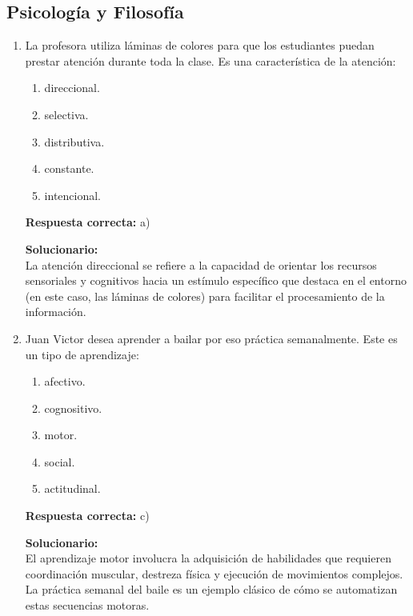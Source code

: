 \subsection*{Psicología y Filosofía}

\begin{enumerate}
	
	
	\item La profesora utiliza láminas de colores para que los estudiantes puedan prestar atención durante toda la clase. Es una característica de la atención:
	
	\begin{enumerate}[label=\alph*)]
		\item direccional.
		\item selectiva.
		\item distributiva.
		\item constante.
		\item intencional.
	\end{enumerate}
	
	\textbf{Respuesta correcta:} a)
	
	\vspace{2mm}
	\textbf{Solucionario:}\\
	La atención direccional se refiere a la capacidad de orientar los recursos sensoriales y cognitivos hacia un estímulo específico que destaca en el entorno (en este caso, las láminas de colores) para facilitar el procesamiento de la información.
	
	\vspace{6mm}
	
	\item Juan Victor desea aprender a bailar por eso práctica semanalmente. Este es un tipo de aprendizaje:
	
	\begin{enumerate}[label=\alph*)]
		\item afectivo.
		\item cognositivo.
		\item motor.
		\item social.
		\item actitudinal.
	\end{enumerate}
	
	\textbf{Respuesta correcta:} c)
	
	\vspace{2mm}
	\textbf{Solucionario:}\\
	El aprendizaje motor involucra la adquisición de habilidades que requieren coordinación muscular, destreza física y ejecución de movimientos complejos. La práctica semanal del baile es un ejemplo clásico de cómo se automatizan estas secuencias motoras.
	

\end{enumerate}
